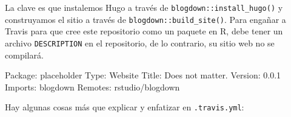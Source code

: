 \documentclass[12pt,]{krantz}
\makeatletter
\newenvironment{Shaded}{\begin{snugshade}}{\end{snugshade}}
\newcommand{\AttributeTok}[1]{\textcolor[rgb]{0.77,0.63,0.00}{#1}}
\newcommand{\FunctionTok}[1]{\textcolor[rgb]{0.00,0.00,0.00}{#1}}
\newcommand{\KeywordTok}[1]{\textcolor[rgb]{0.13,0.29,0.53}{\textbf{#1}}}
\newcommand{\NormalTok}[1]{#1}
\newcommand{\StringTok}[1]{\textcolor[rgb]{0.31,0.60,0.02}{#1}}
\newenvironment{kframe}{%
\medskip{}
\setlength{\fboxsep}{.8em}
 \def\at@end@of@kframe{}%
 \ifinner\ifhmode%
  \def\at@end@of@kframe{\end{minipage}}%
  \begin{minipage}{\columnwidth}%
 \fi\fi%
 \def\FrameCommand##1{\hskip\@totalleftmargin \hskip-\fboxsep
 \colorbox{shadecolor}{##1}\hskip-\fboxsep
     \hskip-\linewidth \hskip-\@totalleftmargin \hskip\columnwidth}%
 \MakeFramed {\advance\hsize-\width
   \@totalleftmargin\z@ \linewidth\hsize
   \@setminipage}}%
 {\par\unskip\endMakeFramed%
 \at@end@of@kframe}
\renewenvironment{Shaded}{\begin{kframe}}{\end{kframe}}
\theoremstyle{definition}
\theoremstyle{definition}
\theoremstyle{definition}
\theoremstyle{remark}
\makeatother
\begin{document}
\begin{Shaded}
\end{Shaded}

La clave es que instalemos Hugo a través de
\texttt{blogdown::install\_hugo()} y construyamos el sitio a través de
\texttt{blogdown::build\_site()}. Para engañar a Travis para que cree
este repositorio como un paquete en R, debe tener un archivo
\texttt{DESCRIPTION} en el repositorio, de lo contrario, su sitio web no
se compilará.

\begin{Shaded}
\begin{Highlighting}[]
\FunctionTok{Package:}\AttributeTok{ placeholder}
\FunctionTok{Type:}\AttributeTok{ Website}
\FunctionTok{Title:}\AttributeTok{ Does not matter.}
\FunctionTok{Version:}\AttributeTok{ 0.0.1}
\FunctionTok{Imports:}\AttributeTok{ blogdown}
\FunctionTok{Remotes:}\AttributeTok{ rstudio/blogdown}
\end{Highlighting}
\end{Shaded}

Hay algunas cosas más que explicar y enfatizar en \texttt{.travis.yml}:
\end{document}
